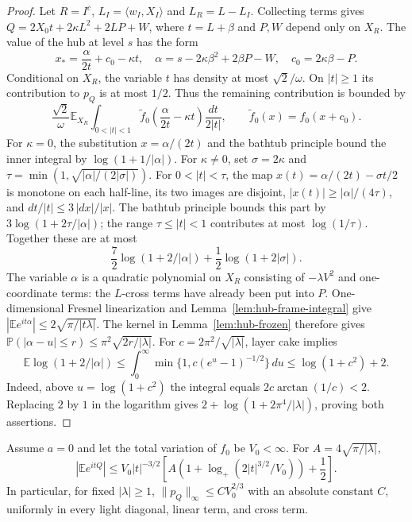 \begin{proof}
Let $R=I^c$, $L_I=\langle w_I,X_I\rangle$ and $L_R=L-L_I$.
Collecting terms gives
$Q=2X_0t+2\kappa L^2+2LP+W$, where $t=L+\beta$ and $P,W$
depend only on $X_R$.  The value of the hub at level $s$ has the form
\[
 x_* =\frac{\alpha}{2t}+c_0-\kappa t,
 \quad
 \alpha=s-2\kappa\beta^2+2\beta P-W,
 \quad c_0=2\kappa\beta-P.
\]
Conditional on $X_R$, the variable $t$ has density at most
$\sqrt2/\omega$.  On $|t|\ge1$ its contribution to $p_Q$ is at most
$1/2$.  Thus the remaining contribution is bounded by
\[
 \frac{\sqrt2}{\omega}\mathbb E_{X_R}
 \int_{0<|t|<1}\widetilde f_0\!\left(\frac\alpha{2t}-\kappa t\right)
                                          \frac{dt}{2|t|},
 \qquad\widetilde f_0(x)=f_0(x+c_0).
\]
For $\kappa=0$, the substitution $x=\alpha/(2t)$ and the bathtub
principle bound the inner integral by $\log(1+1/|\alpha|)$.
For $\kappa\ne0$, set $\sigma=2\kappa$ and
$\tau=\min(1,\sqrt{|\alpha|/(2|\sigma|)})$.
For $0<|t|<\tau$, the map
$x(t)=\alpha/(2t)-\sigma t/2$ is monotone on each half-line,
its two images are disjoint, $|x(t)|\ge|\alpha|/(4\tau)$, and
$dt/|t|\le3\,|dx|/|x|$.
The bathtub principle bounds this part by
$3\log(1+2\tau/|\alpha|)$; the range $\tau\le|t|<1$ contributes at
most $\log(1/\tau)$.
Together these are at most
\[
 \frac72\log(1+2/|\alpha|)+\frac12\log(1+2|\sigma|).
\]
The variable $\alpha$ is a quadratic polynomial on $X_R$ consisting of
$-\lambda V^2$ and one-coordinate terms: the $L$-cross terms have
already been put into $P$.  One-dimensional Fresnel linearization and
Lemma~\ref{lem:hub-frame-integral} give
$|\mathbb E e^{it\alpha}|\le2\sqrt{\pi/|t\lambda|}$.
The kernel in Lemma~\ref{lem:hub-frozen} therefore gives
$\mathbb P(|\alpha-u|\le r)\le\pi^2\sqrt{2r/|\lambda|}$.
For $c=2\pi^2/\sqrt{|\lambda|}$, layer cake implies
\[
 \mathbb E\log(1+2/|\alpha|)
 \le\int_0^\infty\min\{1,c(e^u-1)^{-1/2}\}\,du
 \le\log(1+c^2)+2.
\]
Indeed, above $u=\log(1+c^2)$ the integral equals
$2c\arctan(1/c)<2$.
Replacing $2$ by $1$ in the logarithm gives
$2+\log(1+2\pi^4/|\lambda|)$, proving both assertions.
\end{proof}

\begin{proposition}
\label{prop:hub-bv}
Assume $a=0$ and let the total variation of $f_0$ be $V_0<\infty$.
For $A=4\sqrt{\pi/|\lambda|}$,
\begin{equation}\label{eq:hub-bv-fourier}
 |\mathbb E e^{itQ}|\le V_0|t|^{-3/2}
       \left[A\left(1+\log_+(2|t|^{3/2}/V_0)\right)+\frac12\right].
\end{equation}
In particular, for fixed $|\lambda|\ge1$,
$\|p_Q\|_\infty\le C V_0^{2/3}$ with an absolute constant $C$,
uniformly in every light diagonal, linear term, and cross term.
\end{proposition}

